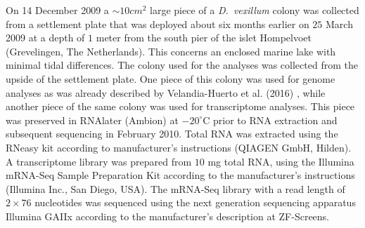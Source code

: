 \documentclass[11pt]{article}
\begin{document}
On 14 December 2009 a $\sim 10 cm^2$ large piece of a \textit{D.\ vexillum} colony was collected
from a settlement plate that was deployed about six months earlier on $25$ March
2009 at a depth of $1$ meter from the south pier of the islet Hompelvoet
(Grevelingen, The Netherlands). This concerns an enclosed marine lake with
minimal tidal differences. The colony used for the analyses was collected from
the upside of the settlement plate. One piece of this colony was used for genome
analyses as was already described by Velandia-Huerto et al. (2016) \cite{}, while
another piece of the same colony was used for transcriptome analyses. This piece
was preserved in RNAlater (Ambion) at $-20^\circ$C prior to RNA extraction and
subsequent sequencing in February 2010. Total RNA was extracted using the RNeasy
kit according to manufacturer’s instructions (QIAGEN GmbH, Hilden). A
transcriptome library was prepared from $10$ mg total RNA, using the Illumina
mRNA-Seq Sample Preparation Kit according to the manufacturer’s instructions
(Illumina Inc., San Diego, USA). The mRNA-Seq library with a read length of
$2\times76$ nucleotides was sequenced using the next generation sequencing apparatus
Illumina GAIIx according to the manufacturer’s description at ZF-Screens.
\end{document}
